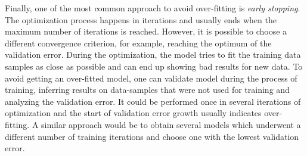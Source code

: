 Finally, one of the most common approach to avoid over-fitting is \emph{early stopping}.
The optimization process happens in iterations and usually ends when the maximum number of iterations is reached.
However, it is possible to choose a different convergence criterion, for example, reaching the optimum of the validation error.
During the optimization, the model tries to fit the training data samples as close as possible and can end up showing bad results for new data.
To avoid getting an over-fitted model, one can validate model during the process of training, inferring results on data-samples that were not used for training and analyzing the validation error.
It could be performed once in several iterations of optimization and the start of validation error growth usually indicates over-fitting.
A similar approach would be to obtain several models which underwent a different number of training iterations and choose one with the lowest validation error.